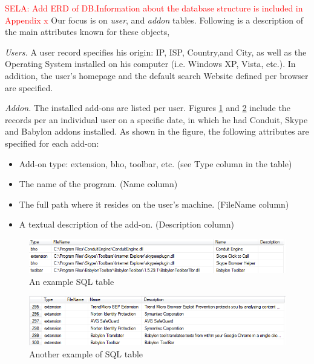 \documentclass[11pt,oneside]{book}
\begin{document}
\textcolor{red}{SELA: Add ERD of DB.Information about the database structure is included in Appendix x} Our focus is on {\it user}, and {\it addon} tables. Following is a description of the main attributes known for these objects,

{\it Users.} A user record specifies his origin: IP, ISP, Country,and City, as well as the Operating System installed on his computer (i.e. Windows XP, Vista, etc.). In addition, the user's homepage and the default search Website defined per browser are specified.

{\it Addon.} The installed add-ons are listed per user. Figures \ref{fig:db_addons_snapshot} and \ref{fig:db_addons_snapshot_desc} include the records per an individual user on a specific date, in which he had Conduit, Skype and Babylon addons installed. As shown in the figure, the following attributes are specified for each add-on:
\begin{itemize}
\item Add-on type: extension, bho, toolbar, etc. (see Type column in the table)
\item The name of the program. (Name column)
\item The full path where it resides on the user's machine. (FileName column)
\item A textual description of the add-on. (Description column)
\end{itemize}

\begin{figure}[t]
\centering
\begin{small}
\includegraphics[scale=.8,angle=0]{figures/db_addons_snapshot.png}
\end{small}
\caption{An example SQL table}
\label{fig:db_addons_snapshot}
\end{figure}

\begin{figure}[t]
\centering
\begin{small}
\includegraphics[scale=.8,angle=0]{figures/db_addons_snapshot_desc.png}
\end{small}
\caption{Another example of SQL table}
\label{fig:db_addons_snapshot_desc}
\end{figure}
\end{document}
